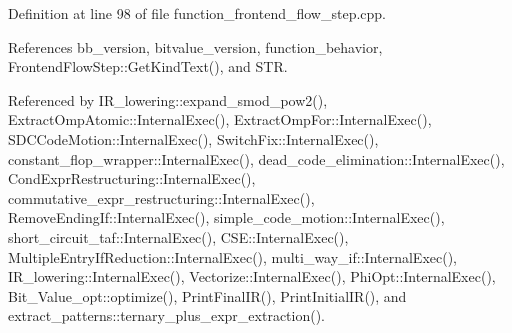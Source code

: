 Definition at line 98 of file function\+\_\+frontend\+\_\+flow\+\_\+step.\+cpp.



References bb\+\_\+version, bitvalue\+\_\+version, function\+\_\+behavior, Frontend\+Flow\+Step\+::\+Get\+Kind\+Text(), and S\+TR.



Referenced by I\+R\+\_\+lowering\+::expand\+\_\+smod\+\_\+pow2(), Extract\+Omp\+Atomic\+::\+Internal\+Exec(), Extract\+Omp\+For\+::\+Internal\+Exec(), S\+D\+C\+Code\+Motion\+::\+Internal\+Exec(), Switch\+Fix\+::\+Internal\+Exec(), constant\+\_\+flop\+\_\+wrapper\+::\+Internal\+Exec(), dead\+\_\+code\+\_\+elimination\+::\+Internal\+Exec(), Cond\+Expr\+Restructuring\+::\+Internal\+Exec(), commutative\+\_\+expr\+\_\+restructuring\+::\+Internal\+Exec(), Remove\+Ending\+If\+::\+Internal\+Exec(), simple\+\_\+code\+\_\+motion\+::\+Internal\+Exec(), short\+\_\+circuit\+\_\+taf\+::\+Internal\+Exec(), C\+S\+E\+::\+Internal\+Exec(), Multiple\+Entry\+If\+Reduction\+::\+Internal\+Exec(), multi\+\_\+way\+\_\+if\+::\+Internal\+Exec(), I\+R\+\_\+lowering\+::\+Internal\+Exec(), Vectorize\+::\+Internal\+Exec(), Phi\+Opt\+::\+Internal\+Exec(), Bit\+\_\+\+Value\+\_\+opt\+::optimize(), Print\+Final\+I\+R(), Print\+Initial\+I\+R(), and extract\+\_\+patterns\+::ternary\+\_\+plus\+\_\+expr\+\_\+extraction().

